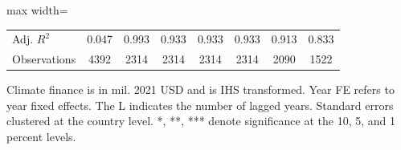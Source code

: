 \begin{table}[htbp]
\begin{adjustbox}{max width=\textwidth}
\begin{tabular}{l*{7}{c}}
Adj. $ R^2$         &       0.047   &       0.993   &       0.933   &       0.933   &       0.933   &       0.913   &       0.833   \\
Observations        &        4392   &        2314   &        2314   &        2314   &        2314   &        2090   &        1522   \\
\bottomrule \end{tabular} \end{adjustbox} \begin{center} \begin{minipage}{0.97\textwidth} \footnotesize \flushleft Climate finance is in mil. 2021 USD and is IHS transformed. Year FE refers to  year fixed effects. The L indicates the number of lagged years. Standard errors clustered at the country level. *, **, *** denote significance at the 10, 5, and 1 percent levels. \end{minipage} \end{center} \end{table}
